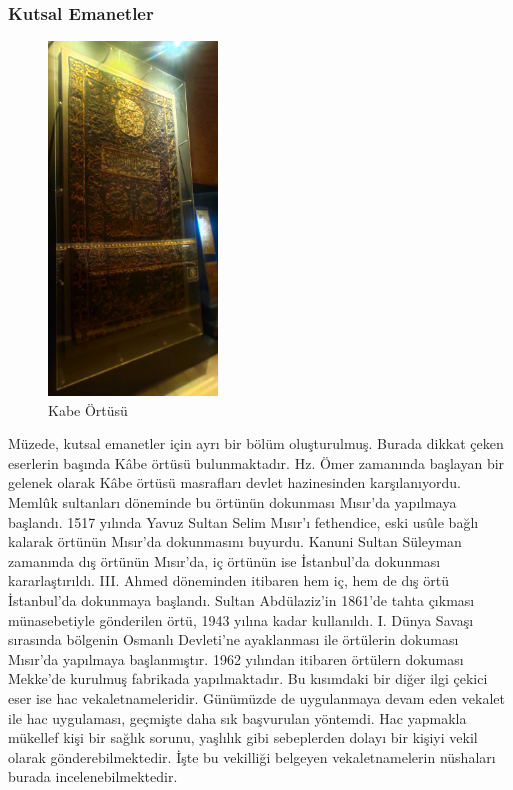 \subsubsection{Kutsal Emanetler}
\begin{figure}
    \includegraphics[width=0.4\textwidth]{assets/kabe.jpg}
    \caption{Kabe Örtüsü}
    \label{fig:kabe}
\end{figure}
\indent\indent Müzede, kutsal emanetler için ayrı bir bölüm oluşturulmuş. Burada dikkat çeken eserlerin başında Kâbe örtüsü bulunmaktadır. Hz. Ömer zamanında başlayan bir gelenek olarak Kâbe örtüsü masrafları devlet hazinesinden karşılanıyordu. Memlûk sultanları döneminde bu örtünün dokunması Mısır'da yapılmaya başlandı. 1517 yılında Yavuz Sultan Selim Mısır'ı fethendice, eski usûle bağlı kalarak örtünün Mısır'da dokunmasını buyurdu. Kanuni Sultan Süleyman zamanında dış örtünün Mısır'da, iç örtünün ise İstanbul'da dokunması kararlaştırıldı. III. Ahmed döneminden itibaren hem iç, hem de dış örtü İstanbul'da dokunmaya başlandı. Sultan Abdülaziz'in 1861'de tahta çıkması münasebetiyle gönderilen örtü, 1943 yılına kadar kullanıldı. I. Dünya Savaşı sırasında bölgenin Osmanlı Devleti'ne ayaklanması ile örtülerin dokuması Mısır'da yapılmaya başlanmıştır. 1962 yılından itibaren örtülern dokuması Mekke'de kurulmuş fabrikada yapılmaktadır.\cite{dia_4}\newline
\indent Bu kısımdaki bir diğer ilgi çekici eser ise hac vekaletnameleridir. Günümüzde de uygulanmaya devam eden vekalet ile hac uygulaması, geçmişte daha sık başvurulan yöntemdi. Hac yapmakla mükellef kişi bir sağlık sorunu, yaşlılık gibi sebeplerden dolayı bir kişiyi vekil olarak gönderebilmektedir. İşte bu vekilliği belgeyen vekaletnamelerin nüshaları burada incelenebilmektedir.\newline
